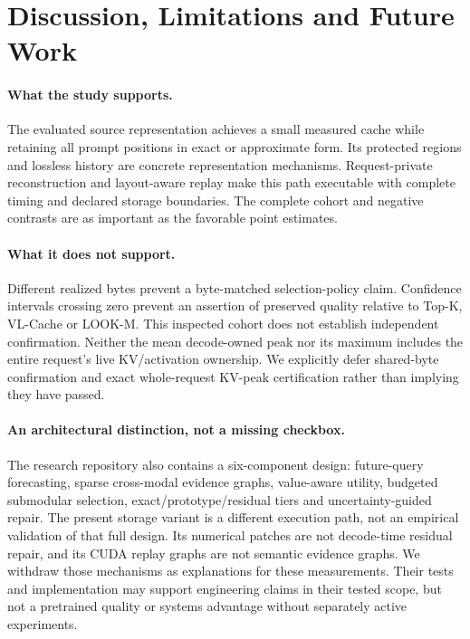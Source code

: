 \section{Discussion, Limitations and Future Work}
\label{sec:discussion}
\paragraph{What the study supports.}
The evaluated source representation achieves a small measured cache while
retaining all prompt positions in exact or approximate form. Its protected
regions and lossless history are concrete representation mechanisms.
Request-private reconstruction and layout-aware replay make this path
executable with complete timing and declared storage boundaries. The
complete cohort and negative contrasts are as important as the favorable
point estimates.

\paragraph{What it does not support.}
Different realized bytes prevent a byte-matched selection-policy claim.
Confidence intervals crossing zero prevent an assertion of preserved
quality relative to Top-K, VL-Cache or LOOK-M. This inspected cohort does
not establish independent confirmation. Neither the mean decode-owned
peak nor its maximum includes the entire request's live KV/activation
ownership. We explicitly defer shared-byte confirmation and exact
whole-request KV-peak certification rather than implying they have passed.

\paragraph{An architectural distinction, not a missing checkbox.}
The research repository also contains a six-component design: future-query
forecasting, sparse cross-modal evidence graphs, value-aware utility,
budgeted submodular selection, exact/prototype/residual tiers and
uncertainty-guided repair. The present storage variant is a different
execution path, not an empirical validation of that full design. Its
numerical patches are not decode-time residual repair, and its CUDA replay
graphs are not semantic evidence graphs. We withdraw those mechanisms as
explanations for these measurements. Their tests and implementation may
support engineering claims in their tested scope, but not a pretrained
quality or systems advantage without separately active experiments.

